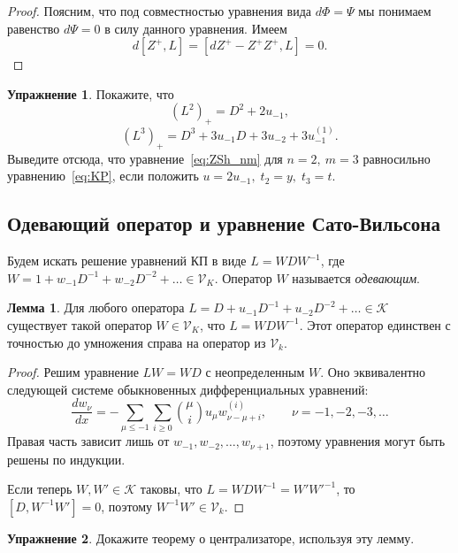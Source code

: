 \documentclass{article}
\theoremstyle{definition}
\theoremstyle{definition} %
\theoremstyle{remark}     %
\theoremstyle{definition}
\theoremstyle{definition}
\theoremstyle{definition}
\theoremstyle{definition}
\newtheorem{lemma}[theorem]{Лемма}
\theoremstyle{definition}
\theoremstyle{definition}
\theoremstyle{definition}
\theoremstyle{definition}
\newtheorem{exercise}{Упражнение}[section]
\begin{document}
\begin{proof}
Поясним, что под совместностью уравнения вида \( d\Phi = \Psi \) мы понимаем равенство \( d\Psi = 0 \) в силу данного уравнения. Имеем
\[
d[Z^+, L] = [dZ^+ - Z^+ Z^+, L] = 0.
\]
\end{proof}

\begin{exercise}
Покажите, что
\[
(L^2)_+ = D^2 + 2u_{-1},
\]
\[
(L^3)_+ = D^3 + 3u_{-1}D + 3u_{-2} + 3u^{(1)}_{-1}.
\]
Выведите отсюда, что уравнение~\ref{eq:ZSh_nm} для $n=2,\ m=3$ равносильно уравнению~\ref{eq:KP}, если положить \( u = 2u_{-1}, \; t_2 = y, \; t_3 = t \).
\end{exercise}




\subsection{Одевающий оператор и уравнение Сато-Вильсона}\label{dressing_operator}


Будем искать решение уравнений КП в виде \(L = WDW^{-1}\), где 
\(W = 1 + w_{-1}D^{-1} + w_{-2}D^{-2} + \dots \in \mathcal{V}_K\). 
Оператор \(W\) называется \textit{одевающим}.


\begin{lemma}
  Для любого оператора \( L = D + u_{-1}D^{-1} + u_{-2}D^{-2} + \dots \in \mathcal{K} \) существует такой оператор \( W \in \mathcal{V}_K \), что \( L = WDW^{-1} \). Этот оператор единствен с точностью до умножения справа на оператор из \( \mathcal{V}_k \).
\end{lemma}

\begin{proof}
  Решим уравнение \( LW = WD \) с неопределенным \( W \). Оно эквивалентно следующей системе обыкновенных дифференциальных уравнений:
  \[
    \frac{dw_\nu}{dx} = -\sum_{\mu \leq -1} \sum_{i \geq 0} \binom{\mu}{i} u_\mu w^{(i)}_{\nu-\mu+i}, \qquad \nu = -1, -2, -3, \dots
  \]
  Правая часть зависит лишь от \( w_{-1}, w_{-2}, \dots, w_{\nu+1} \), поэтому уравнения могут быть решены по индукции.

  Если теперь \( W, W' \in \mathcal{K} \) таковы, что \( L = WDW^{-1} = W'W'^{-1} \), то \( [D, W^{-1}W'] = 0 \), поэтому \( W^{-1}W' \in \mathcal{V}_k \).
\end{proof}

\begin{exercise}
  Докажите теорему о централизаторе, используя эту лемму.
\end{exercise}
\end{document}
